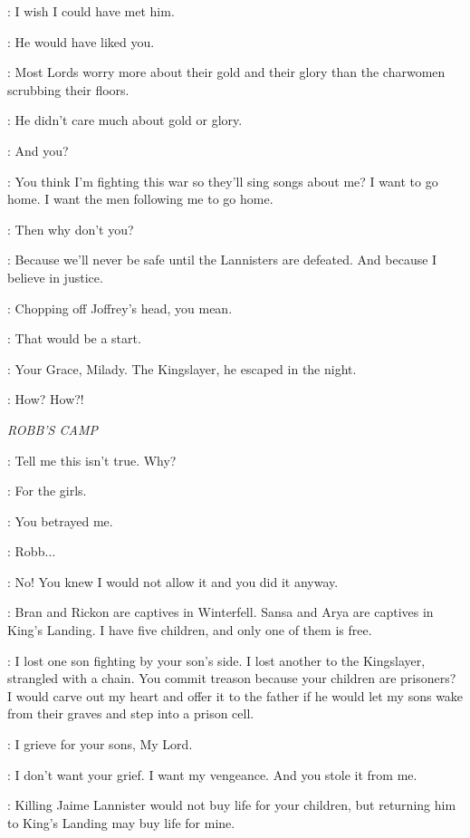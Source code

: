 \TALISA: I wish I could have met him. 

\ROBB: He would have liked you. 

\TALISA: Most Lords worry more about their gold and their glory than the charwomen scrubbing their floors. 

\ROBB: He didn't care much about gold or glory. 

\TALISA: And you? 

\ROBB: You think I'm fighting this war so they'll sing songs about me? I want to go home. I want the men following me to go home. 

\TALISA: Then why don't you? 

\ROBB: Because we'll never be safe until the Lannisters are defeated. And because I believe in justice. 

\TALISA: Chopping off Joffrey's head, you mean. 

\ROBB: That would be a start. 


\MESSENGER: Your Grace, Milady. The Kingslayer, he escaped in the night. 

\ROBB: How? How?! 

\scene

\textit{ROBB'S CAMP} 


\ROBB: Tell me this isn't true. Why? 

\CATELYN: For the girls. 

\ROBB: You betrayed me. 

\CATELYN: Robb$\ldots$  

\ROBB: No! You knew I would not allow it and you did it anyway. 

\CATELYN: Bran and Rickon are captives in Winterfell. Sansa and Arya are captives in King's Landing. I have five children, and only one of them is free. 

\KARSTARK: I lost one son fighting by your son's side. I lost another to the Kingslayer, strangled with a chain. You commit treason because your children are prisoners? I would carve out my heart and offer it to the father if he would let my sons wake from their graves and step into a prison cell. 

\CATELYN: I grieve for your sons, My Lord. 

\KARSTARK: I don't want your grief. I want my vengeance. And you stole it from me. 

\CATELYN: Killing Jaime Lannister would not buy life for your children, but returning him to King's Landing may buy life for mine. 

